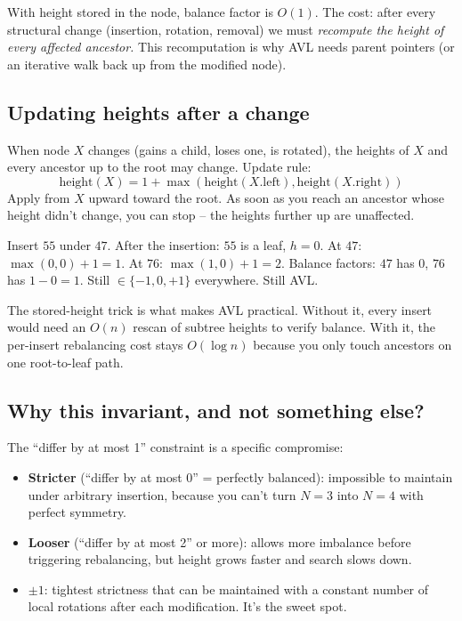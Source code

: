 \documentclass[11pt]{article}
\begin{document}
With height stored in the node, balance factor is $O(1)$. The cost: after every structural change (insertion, rotation, removal) we must \emph{recompute the height of every affected ancestor.} This recomputation is why AVL needs parent pointers (or an iterative walk back up from the modified node).

\subsection*{Updating heights after a change}

When node $X$ changes (gains a child, loses one, is rotated), the heights of $X$ and every ancestor up to the root may change. Update rule:
\[
\text{height}(X) = 1 + \max(\text{height}(X.\text{left}), \text{height}(X.\text{right}))
\]
Apply from $X$ upward toward the root. As soon as you reach an ancestor whose height didn't change, you can stop -- the heights further up are unaffected.

\begin{center}
\end{center}

Insert $55$ under $47$. After the insertion: $55$ is a leaf, $h=0$. At $47$: $\max(0, 0) + 1 = 1$. At $76$: $\max(1, 0) + 1 = 2$. Balance factors: $47$ has $0$, $76$ has $1 - 0 = 1$. Still $\in \{-1, 0, +1\}$ everywhere. Still AVL.

\begin{ideabox}
The stored-height trick is what makes AVL practical. Without it, every insert would need an $O(n)$ rescan of subtree heights to verify balance. With it, the per-insert rebalancing cost stays $O(\log n)$ because you only touch ancestors on one root-to-leaf path.
\end{ideabox}

\subsection*{Why this invariant, and not something else?}

The ``differ by at most 1'' constraint is a specific compromise:
\begin{itemize}[leftmargin=*]
    \item \textbf{Stricter} (``differ by at most 0'' = perfectly balanced): impossible to maintain under arbitrary insertion, because you can't turn $N = 3$ into $N = 4$ with perfect symmetry.
    \item \textbf{Looser} (``differ by at most 2'' or more): allows more imbalance before triggering rebalancing, but height grows faster and search slows down.
    \item \textbf{$\pm 1$}: tightest strictness that can be maintained with a constant number of local rotations after each modification. It's the sweet spot.
\end{itemize}
\end{document}
